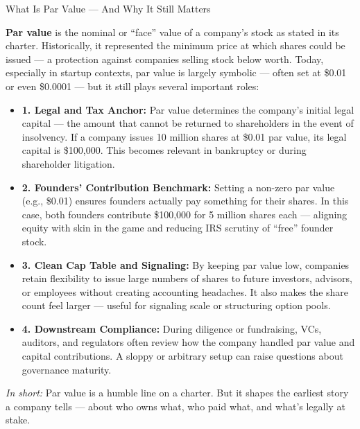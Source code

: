\begin{TechnicalSidebar}{What Is Par Value — And Why It Still Matters}

  \textbf{Par value} is the nominal or “face” value of a company’s stock as stated in its charter. Historically, it 
  represented the minimum price at which shares could be issued — a protection against companies selling stock below 
  worth. Today, especially in startup contexts, par value is largely symbolic — often set at \$0.01 or even \$0.0001 — 
  but it still plays several important roles:
  
  \medskip

  \begin{itemize}
    \item \textbf{1. Legal and Tax Anchor:}  
    Par value determines the company’s initial legal capital — the amount that cannot be returned to shareholders in the event of insolvency. If a company issues 10 million shares at \$0.01 par value, its legal capital is \$100,000. This becomes relevant in bankruptcy or during shareholder litigation.
    
    \item \textbf{2. Founders’ Contribution Benchmark:}  
    Setting a non-zero par value (e.g., \$0.01) ensures founders actually pay something for their shares. In this case, both founders contribute \$100,000 for 5 million shares each — aligning equity with skin in the game and reducing IRS scrutiny of “free” founder stock.
    
    \item \textbf{3. Clean Cap Table and Signaling:}  
    By keeping par value low, companies retain flexibility to issue large numbers of shares to future investors, advisors, or employees without creating accounting headaches. It also makes the share count feel larger — useful for signaling scale or structuring option pools.
    
    \item \textbf{4. Downstream Compliance:}  
    During diligence or fundraising, VCs, auditors, and regulators often review how the company handled par value and capital contributions. A sloppy or arbitrary setup can raise questions about governance maturity.
  \end{itemize}
  
  \medskip
  
  \textit{In short:} Par value is a humble line on a charter. But it shapes the earliest story a company tells — about who owns what, who paid what, and what’s legally at stake.
  
\end{TechnicalSidebar}

